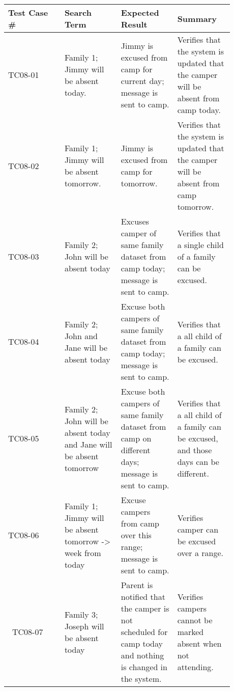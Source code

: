 \documentclass[11pt]{article}
\begin{document}
\begin{center}
\begin{longtable}{|p{0.22\linewidth}|p{0.22\linewidth}|p{0.22\linewidth}|p{0.22\linewidth}|}
	\hline
	Test Case \# & Search Term & Expected Result & Summary\\\hline
	TC08-01 & Family 1; Jimmy will be absent today. & Jimmy is excused from camp for current day; message is sent to camp. & Verifies that the system is updated that the camper will be absent from camp today.\vspace*{1em}\\\hline
	TC08-02 & Family 1; Jimmy will be absent tomorrow. & Jimmy is excused from camp for tomorrow. & Verifies that the system is updated that the camper will be absent from camp tomorrow.\vspace*{1em}\\	\hline
	TC08-03 & Family 2; John will be absent today & Excuses camper of same family dataset from camp today; message is sent to camp. & Verifies that a single child of a family can be excused.\vspace*{1em}\\\hline
	TC08-04 & Family 2; John and Jane will be absent today & Excuse both campers of same family dataset from camp today; message is sent to camp. & Verifies that a all child of a family can be excused.\vspace*{1em}\\\hline
	TC08-05 & Family 2; John will be absent today and Jane will be absent tomorrow & Excuse both campers of same family dataset from camp on different days; message is sent to camp. & Verifies that a all child of a family can be excused, and those days can be different.\vspace*{1em}\\\hline
	TC08-06 & Family 1; Jimmy will be absent tomorrow -> week from today & Excuse campers from camp over this range; message is sent to camp. & Verifies camper can be excused over a range.\vspace*{1em}\\\hline\
	TC08-07 & Family 3; Joseph will be absent today & Parent is notified that the camper is not scheduled for camp today and nothing is changed in the system. & Verifies campers cannot be marked absent when not attending.\vspace*{1em}\\\hline
\end{longtable}
\end{center}
\end{document}
